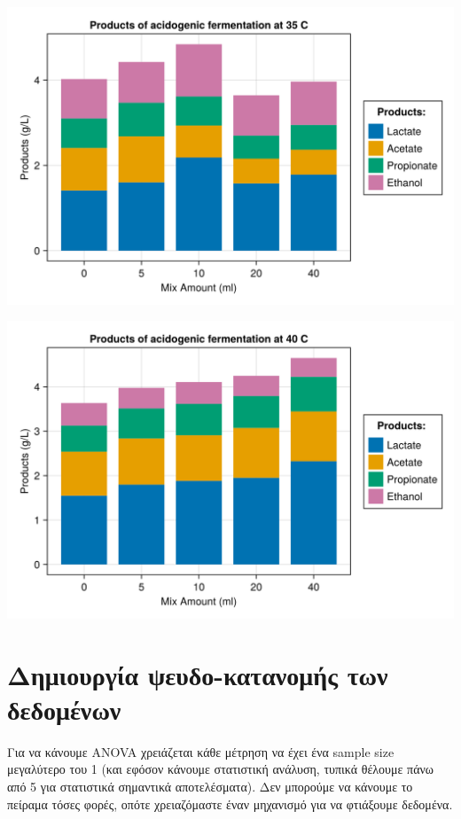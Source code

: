 \documentclass[11pt]{article}
\begin{document}
\begin{center}
\includegraphics[width=.9\linewidth]{../plots/10_11/final_product_bar_10_11.png}
\end{center}

\begin{center}
\includegraphics[width=.9\linewidth]{../plots/28_11/final_product_bar_28_11.png}
\end{center}

\begin{center}

\end{center}

\section{Δημιουργία ψευδο-κατανομής των δεδομένων}
\label{sec:orgf7b3992}
Για να κάνουμε ANOVA χρειάζεται κάθε μέτρηση να έχει ένα sample size μεγαλύτερο του 1 (και εφόσον κάνουμε στατιστική ανάλυση, τυπικά θέλουμε πάνω από 5 για στατιστικά σημαντικά αποτελέσματα). Δεν μπορούμε να κάνουμε το πείραμα τόσες φορές, οπότε χρειαζόμαστε έναν μηχανισμό για να φτιάξουμε δεδομένα.
\end{document}
